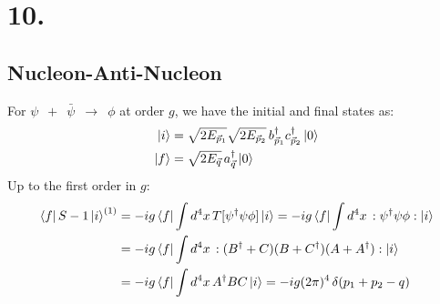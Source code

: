 \documentclass{article}
\newcommand{\vecp}{\vec{p}}
\newcommand{\vecq}{\vec{q}}
\begin{document}
\section*{10.}
\subsection*{Nucleon-Anti-Nucleon}
For $\psi \,\,\, + \,\,\, \bar{\psi} \,\,\,\to\,\,\, \phi $ at order $g$, we have the initial and final states as:
\begin{equation}
    \begin{split}
        \ket{i}&=\sqrt{2E_{\vecp_1}}\sqrt{2E_{\vecp_2}} \, b^\dagger_{\vecp_1}c^\dagger_{\vecp_2}\ket{0}\\
        \ket{f}&=\sqrt{2E_{\vecq}} \, a^\dagger_{\vecq}\ket{0}\\
    \end{split}
\end{equation}
Up to the first order in $g$:
\begin{equation}
    \begin{split}
        \bra{f}S-1\ket{i}^{(1)} &= -ig \bra{f}\int d^4x\,T[\psi^\dagger\psi\phi]\ket{i}=-ig \bra{f}\int d^4x\,:\psi^\dagger\psi\phi:\ket{i}\\
        &= -ig \bra{f}\int d^4x\,:(B^\dagger+C)(B+C^\dagger)(A+A^\dagger):\ket{i}\\
        &=-ig \bra{f}\int d^4x\,A^\dagger B C\ket{i}=-ig(2\pi)^4\,\delta(p_1+p_2-q)
    \end{split}
\end{equation}
\end{document}
